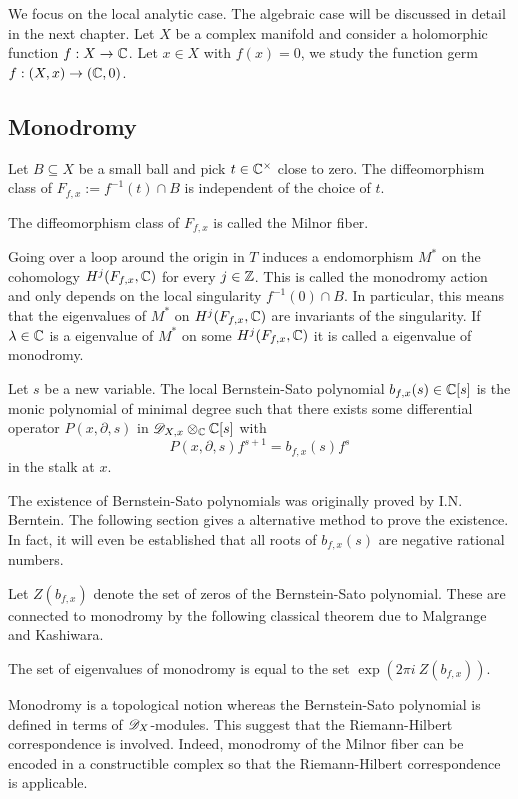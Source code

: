 We focus on the local analytic case.
The algebraic case will be discussed in detail in the next chapter.
Let $X$ be a complex manifold and consider a holomorphic function $f:X \to \mathbb{C}$.
Let $x\in X$ with $f(x) = 0$, we study the function germ $f:(X,x)\to (\mathbb{C},0)$.
\subsection{Monodromy}
\begin{theorem}{\cite{milnor2016singular}}
  Let $B\subseteq X$ be a small ball and pick $t\in \mathbb{C}^\times$ close to zero. The diffeomorphism class of $F_{f,x} := f^{-1}(t)\cap B $  is independent of the choice of $t$.
\end{theorem}
\begin{definition}
  The diffeomorphism class of $F_{f,x}$ is called the Milnor fiber.
\end{definition}
Going over a loop around the origin in $T$ induces a endomorphism $M^*$ on the cohomology $H^j(F_{f,x},\mathbb{C})$ for every $j\in \mathbb{Z}$.
This is called the monodromy action and only depends on the local singularity $f^{-1}(0)\cap B$.
In particular, this means that the eigenvalues of $M^*$ on $H^j(F_{f,x},\mathbb{C})$ are invariants of the singularity.
If $\lambda \in \mathbb{C}$ is a eigenvalue of $M^*$ on some $H^j(F_{f,x},\mathbb{C})$ it is called a eigenvalue of monodromy.


\begin{definition}
  Let $s$ be a new variable.
  The local Bernstein-Sato polynomial $b_{f,x}(s)\in \mathbb{C}[s]$ is the monic polynomial of minimal degree such that there exists some differential operator $P(x,\partial,s)$ in $\mathscr{D}_{X,x}\otimes_{\mathbb{C}}\mathbb{C}[s]$ with
  $$P(x,\partial,s) f^{s+1} = b_{f,x}(s) f^s$$
  in the stalk at $x$.
\end{definition}
The existence of Bernstein-Sato polynomials was originally proved by I.N. Berntein.
The following section gives a alternative method to prove the existence.
In fact, it will even be established that all roots of $b_{f,x}(s)$ are negative rational numbers.

Let $Z(b_{f,x})$ denote the set of zeros of the Bernstein-Sato polynomial.
These are connected to monodromy by the following classical theorem due to Malgrange and Kashiwara.
\begin{theorem}{\cite{budur2015bernstein}}\label{thm: EigMonodromy}
The set of eigenvalues of monodromy is equal to the set $\exp(2\pi i\ Z(b_{f,x}))$.
\end{theorem}
Monodromy is a topological notion whereas the Bernstein-Sato polynomial is defined in terms of $\mathscr{D}_X$-modules.
This suggest that the Riemann-Hilbert correspondence is involved.
Indeed, monodromy of the Milnor fiber can be encoded in a constructible complex so that the Riemann-Hilbert correspondence is applicable.

